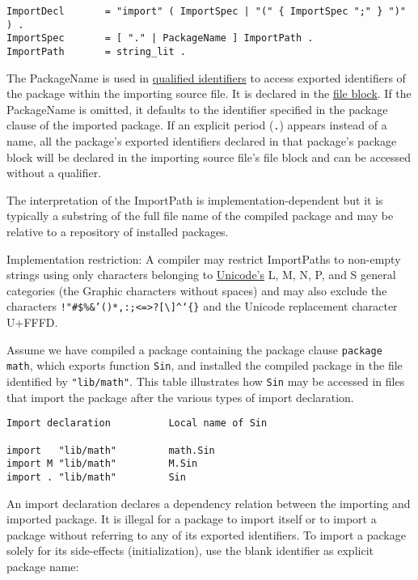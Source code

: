 {\begin{Verbatim}[frame=single]
ImportDecl       = "import" ( ImportSpec | "(" { ImportSpec ";" } ")" ) .
ImportSpec       = [ "." | PackageName ] ImportPath .
ImportPath       = string_lit .
\end{Verbatim}

The PackageName is used in \hyperref[Qualified\_identifiers]{qualified
identifiers} to access exported identifiers of the package within the
importing source file. It is declared in the \hyperref[Blocks]{file
block}. If the PackageName is omitted, it defaults to the identifier
specified in the package clause of the
imported package. If an explicit period (\texttt{.}) appears instead of
a name, all the package's exported identifiers declared in that
package's package block will be declared in the
importing source file's file block and can be accessed without a
qualifier.

The interpretation of the ImportPath is implementation-dependent but it
is typically a substring of the full file name of the compiled package
and may be relative to a repository of installed packages.

Implementation restriction: A compiler may restrict ImportPaths to
non-empty strings using only characters belonging to
\href{http://www.unicode.org/versions/Unicode6.0.0/}{Unicode's} L, M, N,
P, and S general categories (the Graphic characters without spaces) and
may also exclude the characters
\texttt{!"\#\$\%\&'()*,:;\textless{}=\textgreater{}?{[}\textbackslash{}{]}\^{}`\{\textbar{}\}}
and the Unicode replacement character U+FFFD.

Assume we have compiled a package containing the package clause
\texttt{package math}, which exports function \texttt{Sin}, and
installed the compiled package in the file identified by
\texttt{"lib/math"}. This table illustrates how \texttt{Sin} may be
accessed in files that import the package after the various types of
import declaration.

\begin{Verbatim}[frame=single]
Import declaration          Local name of Sin

import   "lib/math"         math.Sin
import M "lib/math"         M.Sin
import . "lib/math"         Sin
\end{Verbatim}

An import declaration declares a dependency relation between the
importing and imported package. It is illegal for a package to import
itself or to import a package without referring to any of its exported
identifiers. To import a package solely for its side-effects
(initialization), use the blank identifier
as explicit package name:

}
